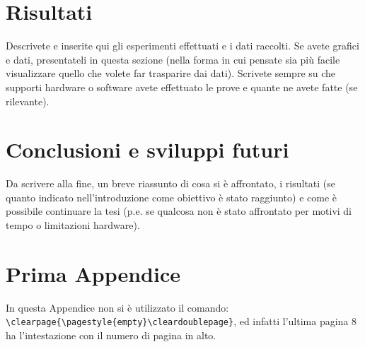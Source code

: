 \documentclass[12pt,a4paper,openright,twoside]{report}
\renewcommand{\chaptermark}[1]{\markboth{\thechapter.\ #1}{}}
\begin{document}
\clearpage{\pagestyle{empty}\cleardoublepage}



\chapter{Risultati}
Descrivete e inserite qui gli esperimenti effettuati e i dati raccolti. Se avete grafici e dati, presentateli in questa sezione (nella forma in cui pensate sia pi\`u facile visualizzare quello che volete far trasparire dai dati). Scrivete sempre su che supporti hardware o software avete effettuato le prove e quante ne avete fatte (se rilevante).


\clearpage{\pagestyle{empty}\cleardoublepage}



\chapter{Conclusioni e sviluppi futuri}

Da scrivere alla fine, un breve riassunto di cosa si \`e affrontato, i risultati (se quanto indicato nell'introduzione come obiettivo \`e stato raggiunto) e come \`e possibile continuare la tesi (p.e. se qualcosa non \`e stato affrontato per motivi di tempo o limitazioni hardware).


\clearpage{\pagestyle{empty}\cleardoublepage}



\renewcommand{\chaptermark}[1]{\markright{\thechapter \ #1}{}}
\lhead[\fancyplain{}{\bfseries\thepage}]{\fancyplain{}{\bfseries\rightmark}}
\appendix %
\chapter{Prima Appendice} %
In questa Appendice non si \`e utilizzato il comando:\\
\verb"\clearpage{\pagestyle{empty}\cleardoublepage}", ed infatti l'ultima pagina 8 ha l'intestazione con il numero di pagina in alto.
\end{document}
